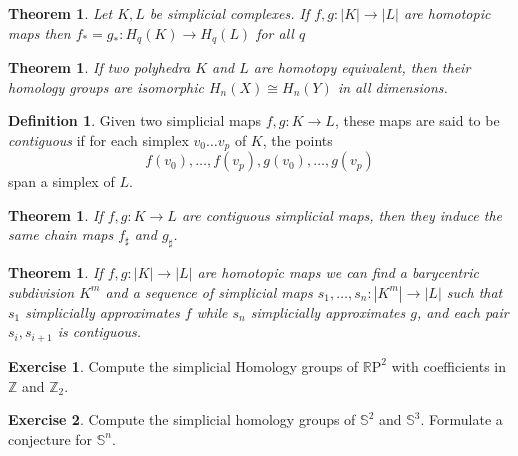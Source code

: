 \documentclass[a4paper,DIV12,10pt]{scrartcl}
\newcommand{\Z}{\ensuremath{\mathbb{Z}}}   %
\newcommand{\R}{\ensuremath{\mathbb{R}}}   %
\newtheorem{theorem}[satz]{Theorem}
\theoremstyle{definition}
\newtheorem{definition}[satz]{Definition}
\newtheorem{exercise}{Exercise}
\newtheorem{beispiel}[satz]{Beispiel}
\begin{document}
\begin{theorem}\label{homotopy_invariance} Let $K, L$ be simplicial complexes.
	If $f,g:|K|\to |L|$ are homotopic maps then $f_\ast=g_\ast: H_q(K)\to H_q(L)$ for all $q$
\end{theorem}

\begin{theorem}
	If two polyhedra $K$ and $L$ are homotopy equivalent, then their homology groups are isomorphic $H_n(X)\cong H_n(Y)$ in all dimensions.
\end{theorem}
\begin{definition}%
	Given two simplicial maps $f,g: K\to L$, these maps are said to be \textit{contiguous} if for each simplex $v_0\dots v_p$ of $K$, the points \[
	f(v_0),\dots,f(v_p),g(v_0),\dots,g(v_p)
	\] span a simplex of $L$.
\end{definition}


\begin{theorem}\label{contiguous->chain_hom}%
	If $f,g: K\to L$ are contiguous simplicial maps, then they induce the same chain maps $f_\sharp$ and $g_\sharp$.
\end{theorem}

\begin{theorem} If $f,g:|K|\to |L|$ are homotopic maps we can find a barycentric subdivision $K^m$ and a sequence of simplicial maps $s_1,\dots,s_n:|K^m|\to|L|$ such that $s_1$ simplicially approximates $f$ while $s_n$ simplicially approximates $g$, and each pair $s_i,s_{i+1}$ is contiguous.
\end{theorem}
\vspace{0.05cm}

  \begin{exercise}
    Compute the simplicial Homology groups of $\R \mathrm{P}^2$ with coefficients in $\Z$ and $\Z_2$.
  \end{exercise}
\begin{exercise}
	Compute the simplicial homology groups of $\mathbb{S}^2$ and $\mathbb{S}^3$. Formulate a conjecture for $\mathbb{S}^n$.
\end{exercise}
\end{document}
